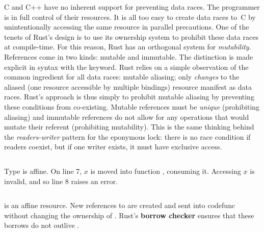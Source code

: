 C and C++ have no inherent support for preventing data races. The programmer is in full control of their resources. It is all too easy to create data races to~C by unintentionally accessing the same resource in parallel precautions. One of the tenets of Rust's design is to use its ownership system to prohibit these data races at compile-time. For this reason, Rust has an orthogonal system for \textit{mutability}. References come in two kinds: mutable and immutable. The distinction is made explicit in syntax with the  keyword. Rust relies on a simple observation of the common ingredient for all data races: mutable aliasing; only \textit{changes} to the aliased (one resource accessible by multiple bindings) resource manifest as data races. Rust's approach is thus simply to prohibit mutable aliasing by preventing these conditions from co-existing. Mutable references must be \textit{unique} (prohibiting aliasing) and immutable references do not allow for any operations that would mutate their referent (prohibiting mutability). This is the same thinking behind the \textit{readers-writer} pattern for the eponymous lock: there is no race condition if readers coexist, but if one writer exists, it must have exclusive access. 




\begin{listing}[ht]
	\centering
	\inputminted[]{rust}{move.rs}
	\caption[Example of move semantics in Rust.]{Type  is affine. On line 7, $x$ is moved into function , consuming it. Accessing $x$ is invalid, and so line 8 raises an error.}
	\label{listing:move}
\end{listing}

\begin{listing}[ht]
	\centering
	\inputminted[]{rust}{move2.rs}
	\caption[Example of borrowing in Rust.]{ is an affine resource. New references to  are created and sent into code{func} without changing the ownership of . Rust's \textbf{borrow checker} ensures that these borrows do not outlive .}
	\label{listing:move2}
\end{listing}

